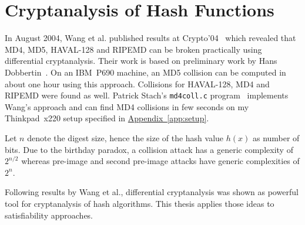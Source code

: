 \section{Cryptanalysis of Hash Functions}
\label{sec:intro-cryptanalysis}
%
In August 2004, Wang et al. published results at Crypto'04~\cite{wang2004} which revealed
that MD4, MD5, HAVAL-128 and RIPEMD can be broken practically using differential cryptanalysis.
Their work is based on preliminary work by Hans Dobbertin~\cite{Dobbertin1998}.
On an IBM~P690 machine, an MD5 collision can be computed in about one hour using this approach.
Collisions for HAVAL-128, MD4 and RIPEMD were found as well. Patrick Stach's \texttt{md4coll.c}
program~\cite{md4coll} implements Wang's approach and can find MD4 collisions in few seconds
on my Thinkpad~x220 setup specified in \hyperref[app:setup]{Appendix~\ref{app:setup}}.

Let $n$ denote the digest size, hence the size of the hash value $h(x)$ as number of bits.
Due to the birthday paradox, a collision attack has a generic complexity of $2^{n/2}$
whereas pre-image and second pre-image attacks have generic complexities of $2^n$.

Following results by Wang et al., differential cryptanalysis was shown as
powerful tool for cryptanalysis of hash algorithms. This thesis applies those
ideas to satisfiability approaches.

